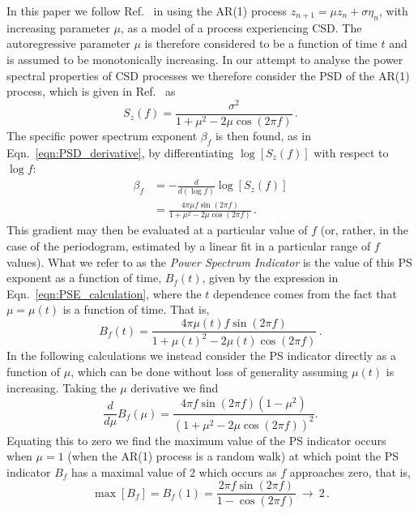 \documentclass[10pt]{iopart}
\begin{document}
In this paper we follow Ref.~\cite{scheffer2009} in using the AR(1) process $z_{n+1} = \mu z_n +\sigma\eta_n$, with increasing parameter $\mu$, as a model of a process experiencing CSD. The autoregressive parameter $\mu$ is therefore considered to be a function of time $t$ and is assumed to be monotonically increasing. In our attempt to analyse the power spectral properties of CSD processes we therefore consider the PSD of the AR(1) process, which is given in Ref.~\cite{vonstorch} as
\begin{equation}
	\label{eqn:1D:PSindicator:AR1powerspectrum}
	S_z(f) = \frac{\sigma^2}{1+ \mu^2 - 2\mu\cos(2\pi f)}\,.
\end{equation}
The specific power spectrum exponent $\beta_f$ is then found, as in Eqn.~\ref{eqn:PSD_derivative}, by differentiating $\log[S_z(f)]$ with respect to $\log f$:
\begin{eqnarray}
	\beta_f &= -\frac{d}{d(\log f)}\log[S_z(f)]\\
	&= \frac{4\pi \mu f \sin(2\pi f)}{1+\mu^2-2\mu\cos(2\pi f)}\,.
	\label{eqn:PSE_calculation}
\end{eqnarray}
This gradient may then be evaluated at a particular value of $f$ (or, rather, in the case of the periodogram, estimated by a linear fit in a particular range of $f$ values). What we refer to as the \emph{Power Spectrum Indicator} is the value of this PS exponent as a function of time, $B_f(t)$, given by the expression in Eqn.~\ref{eqn:PSE_calculation}, where the $t$ dependence comes from the fact that $\mu = \mu(t)$ is a function of time. That is,
\begin{equation}
	\label{eqn:1D:PSindicator_AR1}
	B_f(t)= \frac{4\pi \mu(t) f \sin(2\pi f)}{1+\mu(t)^2-2\mu(t)\cos(2\pi f)}\,.
\end{equation}
In the following calculations we instead consider the PS indicator directly as a function of $\mu$, which can be done without loss of generality assuming $\mu(t)$ is increasing. Taking the $\mu$ derivative we find
\begin{equation}
	\frac{d}{d\mu}B_f(\mu) = \frac{4\pi f \sin(2\pi f)(1-\mu^2)}{\left(1+\mu^2-2\mu\cos(2\pi f)\right)^2}.
\end{equation}
Equating this to zero we find the maximum value of the PS indicator occurs when $\mu=1$ (when the AR(1) process is a random walk) at which point the PS indicator $B_f$ has a maximal value of 2 which occurs as $f$ approaches zero, that is,
\begin{equation}
	\label{eqn:1D:maximumPSindicator_AR1}
	\max[B_f] = B_f(1) = \frac{2\pi f \sin(2\pi f)}{1-\cos(2\pi f)} ~\rightarrow~ 2\,.
\end{equation}
\end{document}
